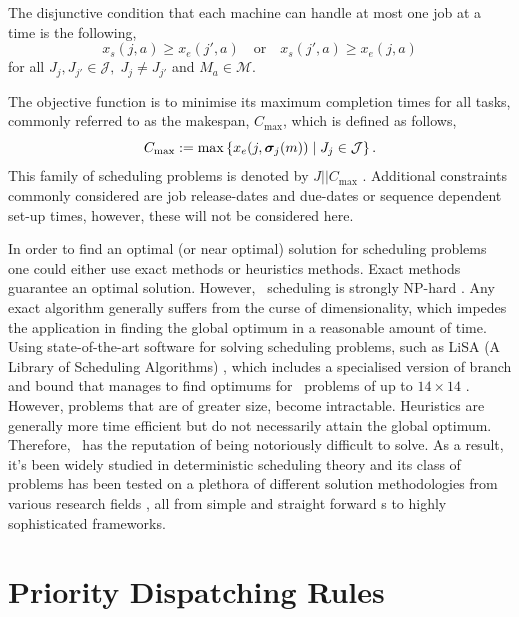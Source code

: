 \documentclass[smallextended]{svjour3}
\begin{document}
The disjunctive condition that each machine can handle at most one job at a 
time is the following,
\begin{equation}\label{eq:oneJobPerMac}
x_s(j,a) \geq x_e(j',a) \quad\textrm{or}\quad x_s(j',a) \geq x_e(j,a)  
\end{equation}
for all $J_j,J_{j'}\in\mathcal{J},\; J_j\neq J_{j'}$ and $M_a\in\mathcal{M}$. 

The objective function is to minimise its maximum completion times for all 
tasks, commonly referred to as the makespan, $C_{\max}$, which is defined as 
follows,
\begin{equation}
C_{\max} := 
\max\left\{x_e(j,\bm \sigma_j(m))\;\middle|\;J_j\in\mathcal{J}\right\}.\label{eq:makespan}
\end{equation} 
This family of scheduling problems is denoted by $J||C_{\max}$ 
\cite{Pinedo08}.
Additional constraints commonly considered are job release-dates and due-dates 
or sequence dependent set-up times, however, these will not be considered here. 

In order to find an optimal (or near optimal) solution for scheduling problems 
one could either use exact methods or heuristics methods. Exact methods 
guarantee an optimal solution. However, \jsp\ scheduling is strongly NP-hard 
\cite{Garey76:NPhard}. Any exact algorithm generally suffers from the curse of 
dimensionality, which impedes the application in finding the global optimum in 
a reasonable amount of time. 
Using state-of-the-art software for solving scheduling problems, such as 
LiSA %
(A Library of Scheduling Algorithms) \cite{LiSA}, which includes a specialised 
version of branch and bound that manages to find optimums for \jsp\ problems of 
up to $14\times14$ \cite{Ru12}. However, problems that are of greater size, 
become intractable. 
Heuristics are generally more time efficient but 
do not necessarily attain the global optimum. Therefore, \jsp\ has the 
reputation of being notoriously difficult to solve. 
As a result, it's been widely studied in deterministic scheduling theory and 
its class of problems has been tested on a plethora of different solution 
methodologies from various research fields \cite{Meeran12}, all from simple and 
straight forward \dr s to highly sophisticated frameworks.


\section{Priority Dispatching Rules} \label{sec:DR}
\end{document}
